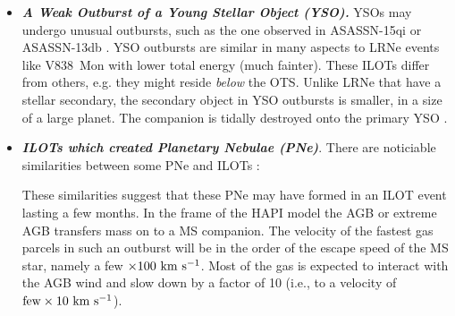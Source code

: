 \documentclass[a4paper,modern]{aastex62}
\newcommand{\tred}[1]{\textcolor{red}{#1}}
\newcommand{\emphbf}[1]{\textbf{\emph{#1}}}
\def \kms{~\rm{km~s^{-1}}}
\def \s{~\rm{s}}
\def \km{~\rm{km}}
\begin{document}
\begin{itemize}
\begin{itemize}
\item \emphbf{A Weak Outburst of a Young Stellar Object (YSO).} YSOs may undergo unusual outbursts, such as the one observed in ASASSN-15qi \citep{2016ApJ...831..133H} or ASASSN-13db \citep{2017A&A...607A.127S}.
YSO outbursts are similar in many aspects to LRNe events like V838~Mon with lower total energy (much fainter). 
These ILOTs differ from others, e.g. they might reside \emph{below} the OTS.
Unlike LRNe that have a stellar secondary, the secondary object in YSO outbursts is smaller, in a size of a large planet.
The companion is tidally destroyed onto the primary YSO \citep{2017MNRAS.468.4938K}. 
%
%
\item \emphbf{ILOTs which created Planetary Nebulae (PNe)}. There are noticiable similarities between some PNe and ILOTs \citep{2012ApJ...746..100S}: 
These similarities suggest that these PNe may have formed in an ILOT event lasting a few months. In the frame of the HAPI model the AGB or extreme AGB transfers mass on to a MS companion.
The velocity of the fastest gas parcels in such an outburst will be in the order of the escape speed of the MS star, namely a few $\times100 \kms$. 
Most of the gas is expected to interact with the AGB wind and slow down by a factor of 10 (i.e., to a velocity of ${\rm few} \times 10 \km \s^{-1}$).


\end{itemize}
\end{itemize}
\end{document}
